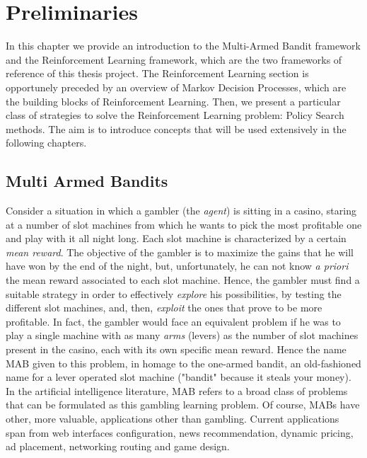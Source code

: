 
\chapter{Preliminaries} \label{Preliminaries}
In this chapter we provide an introduction to the Multi-Armed Bandit framework and the Reinforcement Learning framework, which are the two frameworks of reference of this thesis project. The Reinforcement Learning section is opportunely preceded by an overview of Markov Decision Processes, which are the building blocks of Reinforcement Learning. Then, we present a particular class of strategies to solve the Reinforcement Learning problem: Policy Search methods. The aim is to introduce concepts that will be used extensively in the following chapters.

\section{Multi Armed Bandits} \label{sec:mab}
Consider a situation in which a gambler (the \emph{agent}) is sitting in a casino, staring at a number of slot machines from which he wants to pick the most profitable one and play with it all night long. Each slot machine is characterized by a certain \emph{mean reward}. The objective of the gambler is to maximize the gains that he will have won by the end of the night, but, unfortunately, he can not know \emph{a priori} the mean reward associated to each slot machine. Hence, the gambler must find a suitable strategy in order to effectively \emph{explore} his possibilities, by testing the different slot machines, and, then, \emph{exploit} the ones that prove to be more profitable. In fact, the gambler would face an equivalent problem if he was to play a single machine with as many \emph{arms} (levers) as the number of slot machines present in the casino, each with its own specific mean reward. Hence the name \gls{MAB} \cite{lai1985asymptotically} given to this problem, in homage to the one-armed bandit, an old-fashioned name for a lever operated slot machine ("bandit" because it steals your money). In the artificial intelligence literature, \gls{MAB} refers to a broad class of problems that can be formulated as this gambling learning problem. Of course, \gls{MAB}s have other, more valuable, applications other than gambling. Current applications span from web interfaces configuration, news recommendation, dynamic pricing, ad placement, networking routing and game design. 

